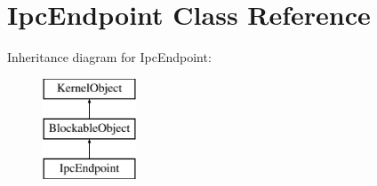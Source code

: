 \hypertarget{class_ipc_endpoint}{}\section{Ipc\+Endpoint Class Reference}
\label{class_ipc_endpoint}
Inheritance diagram for Ipc\+Endpoint\+:\begin{figure}[H]
\begin{center}
\leavevmode
\includegraphics[height=3.000000cm]{class_ipc_endpoint}
\end{center}
\end{figure}
